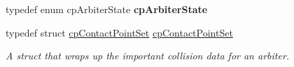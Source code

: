 \begin{DoxyCompactItemize}
\item 
\hypertarget{group__cp_arbiter_ga6c8a907b550aef95fe51604fb975caa5}{typedef enum cp\-Arbiter\-State {\bfseries cp\-Arbiter\-State}}\label{group__cp_arbiter_ga6c8a907b550aef95fe51604fb975caa5}

\item 
\hypertarget{group__cp_arbiter_ga75f9251b64afea972f565dff36d576f4}{typedef struct \hyperlink{structcp_contact_point_set}{cp\-Contact\-Point\-Set} \hyperlink{group__cp_arbiter_ga75f9251b64afea972f565dff36d576f4}{cp\-Contact\-Point\-Set}}\label{group__cp_arbiter_ga75f9251b64afea972f565dff36d576f4}

\begin{DoxyCompactList}\small\item\em A struct that wraps up the important collision data for an arbiter. \end{DoxyCompactList}\end{DoxyCompactItemize}

